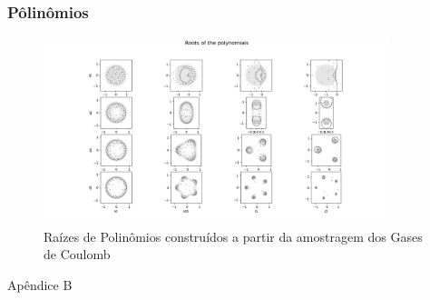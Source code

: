 \begin{frame}
	\frametitle{Pôlinômios}
		\begin{figure}
			\centering
			\includegraphics[width=0.9\textwidth]{./media/Results/roots}	
			\caption{Raízes de Polinômios construídos a partir da amostragem dos Gases de Coulomb}
		\end{figure}
\end{frame}

{
	\begin{frame}
		\begin{center}
			\huge{Apêndice B}
		\end{center}
	\end{frame}
}


